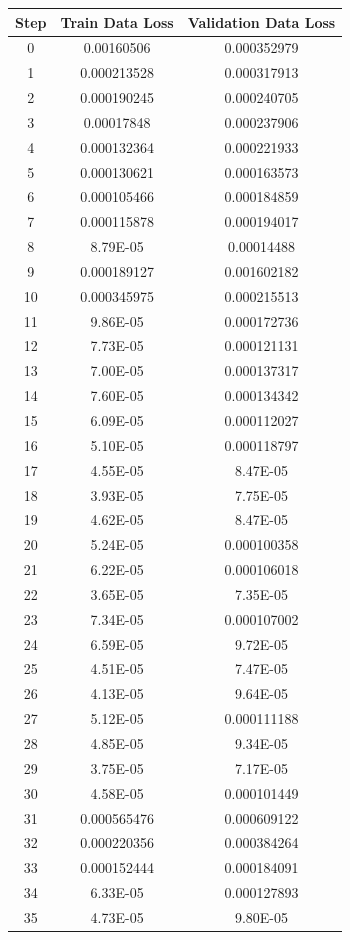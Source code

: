 \documentclass{jreport}		%
\begin{document}
\begin{table}
  \begin{tabular}{c|cc} \hline
Step&Train Data Loss&Validation Data Loss \\ \hline
0&0.00160506&0.000352979 \\
1&0.000213528&0.000317913 \\
2&0.000190245&0.000240705 \\
3&0.00017848&0.000237906 \\
4&0.000132364&0.000221933 \\
5&0.000130621&0.000163573 \\
6&0.000105466&0.000184859 \\
7&0.000115878&0.000194017 \\
8&8.79E-05&0.00014488 \\
9&0.000189127&0.001602182 \\
10&0.000345975&0.000215513 \\
11&9.86E-05&0.000172736 \\
12&7.73E-05&0.000121131 \\
13&7.00E-05&0.000137317 \\
14&7.60E-05&0.000134342 \\
15&6.09E-05&0.000112027 \\
16&5.10E-05&0.000118797 \\
17&4.55E-05&8.47E-05 \\
18&3.93E-05&7.75E-05 \\
19&4.62E-05&8.47E-05 \\
20&5.24E-05&0.000100358 \\
21&6.22E-05&0.000106018 \\
22&3.65E-05&7.35E-05 \\
23&7.34E-05&0.000107002 \\
24&6.59E-05&9.72E-05 \\
25&4.51E-05&7.47E-05 \\
26&4.13E-05&9.64E-05 \\
27&5.12E-05&0.000111188 \\
28&4.85E-05&9.34E-05 \\
29&3.75E-05&7.17E-05 \\
30&4.58E-05&0.000101449 \\
31&0.000565476&0.000609122 \\
32&0.000220356&0.000384264 \\
33&0.000152444&0.000184091 \\
34&6.33E-05&0.000127893 \\
35&4.73E-05&9.80E-05 \\

\end{tabular}
\end{table}
\end{document}
